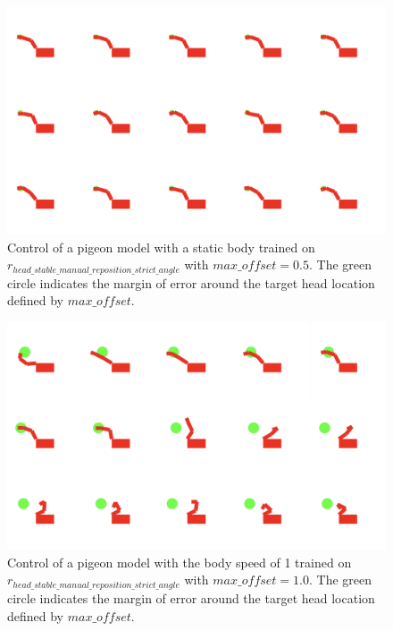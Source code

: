   \begin{figure}[H]
      \centering
      \includegraphics[width=1\textwidth]{figures/frames/frames_001.png}
      \caption{Control of a pigeon model with a static body trained on $r_{head\_stable\_manual\_reposition\_strict\_angle}$ with $max\_offset = 0.5$. The green circle indicates the margin of error around the target head location defined by $max\_offset$.}
      \label{fig:manual_trajectory_body_speed_0}
  \end{figure}

  \begin{figure}[H]
      \centering
      \includegraphics[width=1\textwidth]{figures/frames/frames_002.png}
      \caption{Control of a pigeon model with the body speed of 1 trained on $r_{head\_stable\_manual\_reposition\_strict\_angle}$ with $max\_offset = 1.0$. The green circle indicates the margin of error around the target head location defined by $max\_offset$.}
      \label{fig:manual_trajectory_strict_body_speed_1}
  \end{figure}

